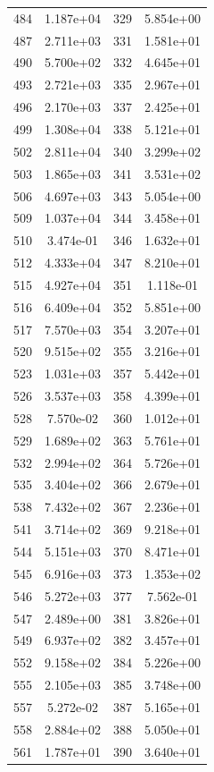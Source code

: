 \documentclass[12pt]{article}
\begin{document}
\begin{longtable}{@{}cccc@{}}
484 & 1.187e+04 & 329 & 5.854e+00 \\
487 & 2.711e+03 & 331 & 1.581e+01 \\
490 & 5.700e+02 & 332 & 4.645e+01 \\
493 & 2.721e+03 & 335 & 2.967e+01 \\
496 & 2.170e+03 & 337 & 2.425e+01 \\
499 & 1.308e+04 & 338 & 5.121e+01 \\
502 & 2.811e+04 & 340 & 3.299e+02 \\
503 & 1.865e+03 & 341 & 3.531e+02 \\
506 & 4.697e+03 & 343 & 5.054e+00 \\
509 & 1.037e+04 & 344 & 3.458e+01 \\
510 & 3.474e-01 & 346 & 1.632e+01 \\
512 & 4.333e+04 & 347 & 8.210e+01 \\
515 & 4.927e+04 & 351 & 1.118e-01 \\
516 & 6.409e+04 & 352 & 5.851e+00 \\
517 & 7.570e+03 & 354 & 3.207e+01 \\
520 & 9.515e+02 & 355 & 3.216e+01 \\
523 & 1.031e+03 & 357 & 5.442e+01 \\
526 & 3.537e+03 & 358 & 4.399e+01 \\
528 & 7.570e-02 & 360 & 1.012e+01 \\
529 & 1.689e+02 & 363 & 5.761e+01 \\
532 & 2.994e+02 & 364 & 5.726e+01 \\
535 & 3.404e+02 & 366 & 2.679e+01 \\
538 & 7.432e+02 & 367 & 2.236e+01 \\
541 & 3.714e+02 & 369 & 9.218e+01 \\
544 & 5.151e+03 & 370 & 8.471e+01 \\
545 & 6.916e+03 & 373 & 1.353e+02 \\
546 & 5.272e+03 & 377 & 7.562e-01 \\
547 & 2.489e+00 & 381 & 3.826e+01 \\
549 & 6.937e+02 & 382 & 3.457e+01 \\
552 & 9.158e+02 & 384 & 5.226e+00 \\
555 & 2.105e+03 & 385 & 3.748e+00 \\
557 & 5.272e-02 & 387 & 5.165e+01 \\
558 & 2.884e+02 & 388 & 5.050e+01 \\
561 & 1.787e+01 & 390 & 3.640e+01 \\

\end{longtable}
\end{document}
